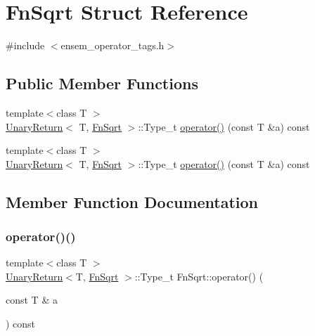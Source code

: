 \hypertarget{structFnSqrt}{}\section{Fn\+Sqrt Struct Reference}
\label{structFnSqrt}


{\ttfamily \#include $<$ensem\+\_\+operator\+\_\+tags.\+h$>$}

\subsection*{Public Member Functions}
\begin{DoxyCompactItemize}
\item 
{\footnotesize template$<$class T $>$ }\\\mbox{\hyperlink{structUnaryReturn}{Unary\+Return}}$<$ T, \mbox{\hyperlink{structFnSqrt}{Fn\+Sqrt}} $>$\+::Type\+\_\+t \mbox{\hyperlink{structFnSqrt_a019bed3e40dc318937e7655b3e4222bb}{operator()}} (const T \&a) const
\item 
{\footnotesize template$<$class T $>$ }\\\mbox{\hyperlink{structUnaryReturn}{Unary\+Return}}$<$ T, \mbox{\hyperlink{structFnSqrt}{Fn\+Sqrt}} $>$\+::Type\+\_\+t \mbox{\hyperlink{structFnSqrt_a019bed3e40dc318937e7655b3e4222bb}{operator()}} (const T \&a) const
\end{DoxyCompactItemize}


\subsection{Member Function Documentation}
\mbox{\label{structFnSqrt_a019bed3e40dc318937e7655b3e4222bb}} 
\subsubsection{\texorpdfstring{operator()()}{operator()()}\hspace{0.1cm}{\footnotesize\ttfamily [1/2]}}
{\footnotesize\ttfamily template$<$class T $>$ \\
\mbox{\hyperlink{structUnaryReturn}{Unary\+Return}}$<$T, \mbox{\hyperlink{structFnSqrt}{Fn\+Sqrt}} $>$\+::Type\+\_\+t Fn\+Sqrt\+::operator() (\begin{DoxyParamCaption}\item[{const T \&}]{a }\end{DoxyParamCaption}) const\hspace{0.3cm}{\ttfamily [inline]}}

